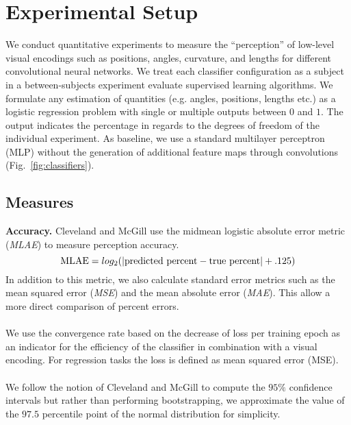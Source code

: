 
\section{Experimental Setup}

We conduct quantitative experiments to measure the ``perception'' of low-level visual encodings such as positions, angles, curvature, and lengths for different convolutional neural networks. We treat each classifier configuration as a subject in a between-subjects experiment evaluate supervised learning algorithms. We formulate any estimation of quantities (e.g. angles, positions, lengths etc.) as a logistic regression problem with single or multiple outputs between $0$ and $1$. The output indicates the percentage in regards to the degrees of freedom of the individual experiment. As baseline, we use a standard multilayer perceptron (MLP) without the generation of additional feature maps through convolutions (Fig.~\ref{fig:classifiers}).

\subsection{Measures}

\textbf{Accuracy.} Cleveland and McGill use the midmean logistic absolute error metric (\emph{MLAE}) to measure perception accuracy.
\begin{equation}
	\textnormal{MLAE} = log_2( | \textnormal{predicted percent} - \textnormal{true percent} | + .125)
\end{equation}
In addition to this metric, we also calculate standard error metrics such as the mean squared error (\emph{MSE}) and the mean absolute error (\emph{MAE}). This allow a more direct comparison of percent errors.
\\~\\
 We use the convergence rate based on the decrease of loss per training epoch as an indicator for the efficiency of the classifier in combination with a visual encoding. For regression tasks the loss is defined as mean squared error (MSE).%
\\~\\
 We follow the notion of Cleveland and McGill to compute the $95\%$ confidence intervals but rather than performing bootstrapping, we approximate the value of the $97.5$ percentile point of the normal distribution for simplicity.

